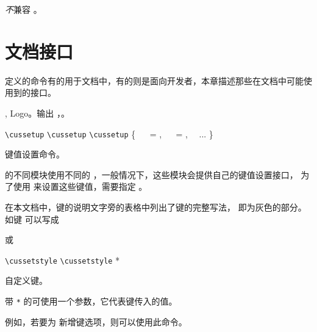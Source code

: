 \documentclass{cusdoc}
\begin{document}
\emph{不}兼容 。

\chapter{文档接口}

\CusTeX 定义的命令有的用于文档中，有的则是面向开发者，本章描述那些在文档中可能使用到的接口。

\begin{function}{\CusTeX,\CusLaTeX}
Logo。输出 \CusTeX，\CusLaTeX。
\end{function}

\begin{function}{\cussetup}
\begin{syntax}
  \verb|\cussetup| 
  \verb|\cussetup|  
  \verb|\cussetup| \{
  ~~ =  ,
  ~~ =  ,
  ~~...
  \}
\end{syntax}
键值设置命令。

\CusTeX 的不同模块使用不同的 ，一般情况下，这些模块会提供自己的键值设置接口，
为了使用  来设置这些键值，需要指定 。
\end{function}

在本文档中，键的说明文字旁的表格中列出了键的完整写法， 即为灰色的部分。
如键  可以写成 
\begin{xample}
或 
\stopxamplecode
\xamplecode\medskip
\end{xample}


\begin{function}{\cussetstyle}
\begin{syntax}
  \verb|\cussetstyle|     
  \verb|\cussetstyle| *   
\end{syntax}
自定义键。

带 \verb|*| 的可使用一个参数，它代表键传入的值。
\end{function}

例如，若要为  新增键选项，则可以使用此命令。
\begin{xample}
\begin{Framed}[frame color=blue, fill color=blue!20, color frame=2]
  \zhlipsum[1]
\end{Framed}
\stopxamplecode
\xamplecode\medskip
\end{xample}
\end{document}
